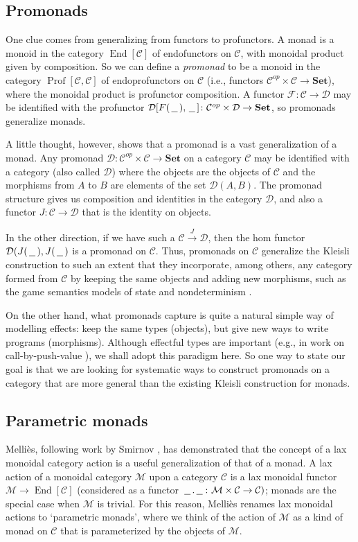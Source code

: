 \documentclass{svproc}
\newcommand\C{\mathcal{C}}
\newcommand\D{\mathcal{D}}
\newcommand\F{\mathcal{F}}
\newcommand\M{\mathcal{M}}
\DeclareMathOperator{\End}{End}
\newcommand\Mellies{Melli\`{e}s\xspace}
\newcommand*\from{\colon}
\newcommand{\0}{{\mathtt{0}}} \newcommand{\com}{{\mathtt{com}}}
\newcommand{\blank}{\,\underline{\hspace{1.5ex}}\,}
\newcommand{\catname}[1]{\mathbf{#1}}
\newcommand{\Set}{\catname{Set}}
\DeclareMathOperator{\Prof}{Prof}
\begin{document}
\subsection{Promonads}

One clue comes from generalizing from functors to profunctors.  
A monad is a monoid in the category $\End[\C]$ of endofunctors on $\C$, with monoidal product given by composition. So we can define a \emph{promonad} to be a monoid in the category $\Prof[\C,\C]$ of endoprofunctors on $\C$ (i.e., functors $\C^{op}\times\C\to \Set$), where the monoidal product is profunctor composition.
A functor $\F\from \C\to \D$ may be identified with the profunctor $\D[F(\blank),\blank]\from\C^{op}\times\D\to\Set$, so promonads generalize monads.

A little thought, however, shows that a promonad is a vast generalization of a monad.  
Any promonad $\D\from\C^{op}\times\C\to\Set$ on a category $\C$ may be identified \cite{Promonad} with a category (also called $\D$) where the objects are the objects of $\C$ and the morphisms from $A$ to $B$ are elements of the set $\D(A,B)$.  
The promonad structure gives us composition and identities in the category $\D$, and also a functor $J\from \C\to\D$ that is the identity on objects.

In the other direction, if we have such a $\C\xrightarrow{J}\D$, then the hom functor $\D(J(\blank),J(\blank)$ is a promonad on $\C$.  
Thus, promonads on $\C$ generalize the Kleisli construction to such an extent that they incorporate, among others, any category formed from $\C$ by keeping the same objects and adding new morphisms, such as the game semantics models of state \cite{SamsonGuyIAPassive} and nondeterminism \cite{mcCHFiniteND}.  

On the other hand, what promonads capture is quite a natural simple way of modelling effects: keep the same types (objects), but give new ways to write programs (morphisms).  
Although effectful types are important (e.g., in work on call-by-push-value \cite{Cbpv}), we shall adopt this paradigm here.
So one way to state our goal is that we are looking for systematic ways to construct promonads on a category that are more general than the existing Kleisli construction for monads.

\subsection{Parametric monads}

\Mellies \cite{ParametricMonads}, following work by Smirnov \cite{Smirnov2008}, has demonstrated that the concept of a lax monoidal category action is a useful generalization of that of a monad.  
A lax action of a monoidal category $\M$ upon a category $\C$ is a lax monoidal functor $\M\to \End[\C]$ (considered as a functor $\blank.\blank\from\M\times\C\to\C)$; monads are the special case when $\M$ is trivial.  
For this reason, \Mellies renames lax monoidal actions to `parametric monads', where we think of the action of $\M$ as a kind of monad on $\C$ that is parameterized by the objects of $\M$.
\end{document}
